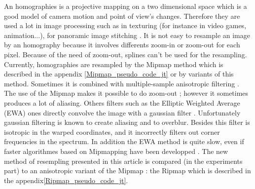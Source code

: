 
An homographies is a projective mapping on a two dimensional space which is a good model of camera motion and point of view's changes. Therefore they are used a lot in image processing such as in texturing \cite{heckbert1983texture} (for instance in video games, animation...), for panoramic image stitching \cite{brown2007automatic}. It is not easy to resample an image by an homography because it involves differents zoom-in or zoom-out for each pixel. Because of the need of zoom-out, splines can't be used for the resampling. Currently, homographies are resampled by the Mipmap method \cite{williams1983pyramidal} which is described in the appendix \ref{Mipmap_pseudo_code_jt} or by variants of this method. Sometimes it is combined
with multiple-sample anisotropic filtering  \cite{barkans1997high}. The use of the Mipmap makes it possible to do zoom-out ; however it sometimes produces a lot of aliasing. Others filters such as the Elliptic Weighted Average (EWA) ones directly convolve the image with a gaussian filter \cite{greene1986creating}. Unfortunately gaussian filtering is known to create aliasing and to overblur. Besides this filter is isotropic in the warped coordinates, and it incorrectly filters out corner frequencies in the spectrum. In addition the EWA method is quite slow, even if faster algorithmes based on Mipmapping have been developped \cite{mccormack1999feline,huttner1999fast}. The new method of resempling presented in this article is compared (in the experiments part) to an anisotropic variant of the Mipmap : the Ripmap \cite{akenine2008real} which is described in the appendix\ref{Ripmap_pseudo_code_jt}.







